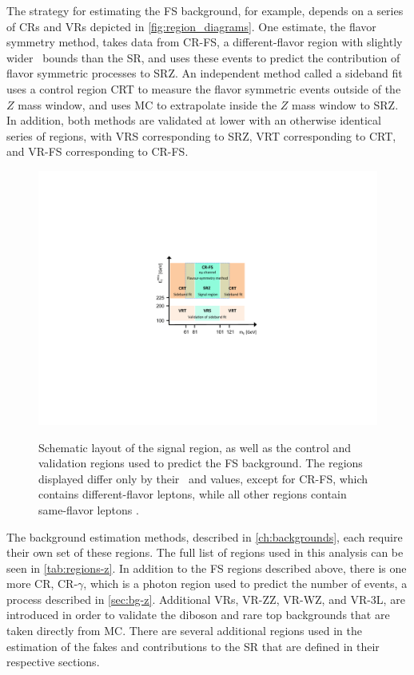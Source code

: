 The strategy for estimating the \ac{FS} background, for example, depends on a series of \acp{CR} and \acp{VR} depicted in \autoref{fig:region_diagrams}. One estimate, the flavor symmetry method, takes data from CR-FS, a different-flavor region with slightly wider \mll~bounds than the \ac{SR}, and uses these events to predict the contribution of flavor symmetric processes to SRZ. An independent method called a sideband fit uses a control region CRT to measure the flavor symmetric events outside of the $Z$ mass window, and uses \ac{MC} to extrapolate inside the $Z$ mass window to SRZ. In addition, both methods are validated at lower \met with an otherwise identical series of regions, with VRS corresponding to SRZ, VRT corresponding to CRT, and VR-FS corresponding to CR-FS. 

\begin{figure}[h]
\centering
\includegraphics[width=.8\textwidth]{figures/fs/FSdiagram_v2.pdf}\\
\caption{
Schematic layout of the signal region, as well as the control and validation regions used to predict the \ac{FS} background. The regions displayed differ only by their \mll~and \met values, except for CR-FS, which contains different-flavor leptons, while all other regions contain same-flavor leptons \cite{this_paper}. 
\label{fig:region_diagrams}
}
\end{figure}

The background estimation methods, described in \autoref{ch:backgrounds}, each require their own set of these regions. The full list of regions used in this analysis can be seen in \autoref{tab:regions-z}. In addition to the \ac{FS} regions described above, there is one more \ac{CR}, CR-$\gamma$, which is a photon region used to predict the number of \dyjets events, a process described in \autoref{sec:bg-z}. Additional \acp{VR}, VR-ZZ, VR-WZ, and VR-3L, are introduced in order to validate the diboson and rare top backgrounds that are taken directly from \ac{MC}. There are several additional regions used in the estimation of the fakes and \dyjets contributions to the \ac{SR} that are defined in their respective sections. 

